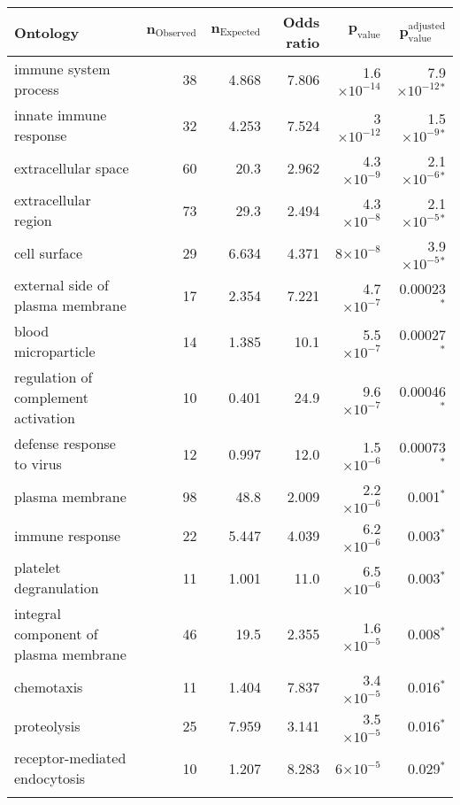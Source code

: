 \documentclass{article}
\begin{document}
\begin{table*}[h!]
	\centering
	\begin{adjustbox}{width = 1\textwidth}
		\small
		\begin{tabular}{|l|r|r|r|r|r|}
			\toprule
			\textbf{Ontology} &
			$\bm{n_{\mathrm{Observed}}}$ &
			$\bm{n_{\mathrm{Expected}}}$ &
			\textbf{Odds ratio} &
			$\bm{p_{\mathrm{value}}}$ &
			$\bm{p_{\mathrm{value}}^{\mathrm{adjusted}}}$ \\
			\midrule
			immune system process & 38 & 4.868 & 7.806 & 1.6$\times 10^{-14}$ & 7.9$\times 10^{-12}$$\bm{^*}$ \\
			innate immune response & 32 & 4.253 & 7.524 & 3$\times 10^{-12}$ & 1.5$\times 10^{-9}$$\bm{^*}$ \\
			extracellular space & 60 & 20.3 & 2.962 & 4.3$\times 10^{-9}$ & 2.1$\times 10^{-6}$$\bm{^*}$ \\
			extracellular region & 73 & 29.3 & 2.494 & 4.3$\times 10^{-8}$ & 2.1$\times 10^{-5}$$\bm{^*}$ \\
			cell surface & 29 & 6.634 & 4.371 & 8$\times 10^{-8}$ & 3.9$\times 10^{-5}$$\bm{^*}$ \\
			external side of plasma membrane & 17 & 2.354 & 7.221 & 4.7$\times 10^{-7}$ & 0.00023$\bm{^*}$ \\
			blood microparticle & 14 & 1.385 & 10.1 & 5.5$\times 10^{-7}$ & 0.00027$\bm{^*}$ \\
			regulation of complement activation & 10 & 0.401 & 24.9 & 9.6$\times 10^{-7}$ & 0.00046$\bm{^*}$ \\
			defense response to virus & 12 & 0.997 & 12.0 & 1.5$\times 10^{-6}$ & 0.00073$\bm{^*}$ \\
			plasma membrane & 98 & 48.8 & 2.009 & 2.2$\times 10^{-6}$ & 0.001$\bm{^*}$ \\
			immune response & 22 & 5.447 & 4.039 & 6.2$\times 10^{-6}$ & 0.003$\bm{^*}$ \\
			platelet degranulation & 11 & 1.001 & 11.0 & 6.5$\times 10^{-6}$ & 0.003$\bm{^*}$ \\
			integral component of plasma membrane & 46 & 19.5 & 2.355 & 1.6$\times 10^{-5}$ & 0.008$\bm{^*}$ \\
			chemotaxis & 11 & 1.404 & 7.837 & 3.4$\times 10^{-5}$ & 0.016$\bm{^*}$ \\
			proteolysis & 25 & 7.959 & 3.141 & 3.5$\times 10^{-5}$ & 0.016$\bm{^*}$ \\
			receptor-mediated endocytosis & 10 & 1.207 & 8.283 & 6$\times 10^{-5}$ & 0.029$\bm{^*}$ \\
$$
\end{tabular}
\end{adjustbox}
\end{table*}
\end{document}
